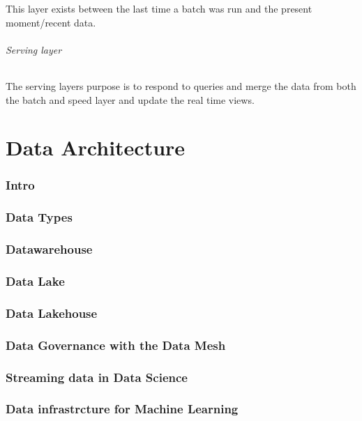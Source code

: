 \documentclass[a4paper, 11pt]{book}
\begin{document}
{    This layer exists between the last time a batch was run and the present moment/recent data.

    \paragraph{Serving layer}
    The serving layers purpose is to respond to queries and merge the data from both the batch and speed layer and update the real time views.


    \part{Data Architecture}


    \section{Intro}


    \section{Data Types}


    \section{Datawarehouse}


    \section{Data Lake}


    \section{Data Lakehouse}


    \section{Data Governance with the Data Mesh}


    \section{Streaming data in Data Science}


    \section{Data infrastrcture for Machine Learning}


}
\end{document}
